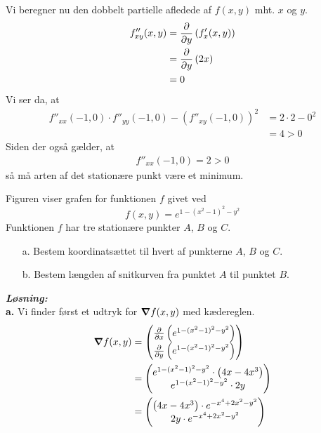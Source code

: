 \documentclass{article}
\newcommand{\sol}{\setlength{\parindent}{0cm}\textbf{\textit{Løsning:}}\setlength{\parindent}{1cm}}
\begin{document}
Vi beregner nu den dobbelt partielle afledede af $f(x,y)$ mht. $x$ og $y$.
\begin{equation*}
\begin{split}
  f''_{xy}(x,y)&= \pdv{y} \left(f'_x(x,y)\right) \\
  &=\pdv{y} \left(2x\right) \\
  &=0
\end{split}
\end{equation*}
Vi ser da, at 
\begin{equation*}
\begin{split}
  f''_{xx}(-1,0) \cdot f''_{yy}(-1,0) - (f''_{xy}(-1,0))^2 &= 2 \cdot 2-0^2\\
  &=4 >0
\end{split}
\end{equation*}
Siden der også gælder, at 
\begin{equation*}
\begin{split}
  f''_{xx}(-1,0)=2>0
\end{split}
\end{equation*}
så må arten af det stationære punkt være et minimum.
\begin{question}{}{}
  Figuren viser grafen for funktionen $f$ givet ved
  \[
  f(x,y)= e^{1-(x^2-1)^2-y^2} 
  \] 
  Funktionen $f$ har tre stationære punkter $A$, $B$ og $C$. 
  \begin{itemize}
    \item[a.] Bestem koordinatsættet til hvert af punkterne $A$, $B$ og $C$. 
    \item[b.] Bestem længden af snitkurven fra punktet $A$ til punktet $B$. 
  \end{itemize}
\end{question}
\sol \\
\textbf{a.}
Vi finder først et udtryk for $\grad f(x,y)$ med kædereglen.
\begin{equation*}
\begin{split}
  \grad f(x,y)&=\mqty(\pdv{x} \left(e^{1-(x^2-1)^2-y^2} \right) \\ \pdv{y} \left(e^{1-(x^2-1)^2-y^2} \right) ) \\
  &=\mqty(e^{1-(x^2-1)^2-y^2} \cdot \left(4x-4x^3\right) \\ e^{1-(x^2-1)^2-y^2} \cdot 2y)\\
  &=\mqty(\left(4x-4x^3\right) \cdot e^{-x^4+2x^2-y^2} \\ 2y \cdot e^{-x^4+2x^2-y^2} ) 
\end{split}
\end{equation*}
\end{document}
